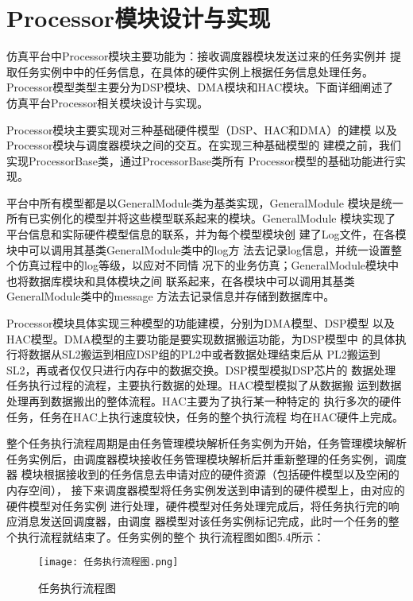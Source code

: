 \section{Processor模块设计与实现}

仿真平台中Processor模块主要功能为：接收调度器模块发送过来的任务实例并
提取任务实例中中的任务信息，在具体的硬件实例上根据任务信息处理任务。
Processor模型类型主要分为DSP模块、DMA模块和HAC模块。下面详细阐述了
仿真平台Processor相关模块设计与实现。

Processor模块主要实现对三种基础硬件模型（DSP、HAC和DMA）的建模
以及Processor模块与调度器模块之间的交互。在实现三种基础模型的
建模之前，我们实现ProcessorBase类，通过ProcessorBase类所有
Processor模型的基础功能进行实现。

平台中所有模型都是以GeneralModule类为基类实现，GeneralModule
模块是统一所有已实例化的模型并将这些模型联系起来的模块。GeneralModule
模块实现了平台信息和实际硬件模型信息的联系，并为每个模型模块创
建了Log文件，在各模块中可以调用其基类GeneralModule类中的log方
法去记录log信息，并统一设置整个仿真过程中的log等级，以应对不同情
况下的业务仿真；GeneralModule模块中也将数据库模块和具体模块之间
联系起来，在各模块中可以调用其基类GeneralModule类中的message
方法去记录信息并存储到数据库中。

Processor模块具体实现三种模型的功能建模，分别为DMA模型、DSP模型
以及HAC模型。DMA模型的主要功能是要实现数据搬运功能，为DSP模型中
的具体执行将数据从SL2搬运到相应DSP组的PL2中或者数据处理结束后从
PL2搬运到SL2，再或者仅仅只进行内存中的数据交换。DSP模型模拟DSP芯片的
数据处理任务执行过程的流程，主要执行数据的处理。HAC模型模拟了从数据搬
运到数据处理再到数据搬出的整体流程。HAC主要为了执行某一种特定的
执行多次的硬件任务，任务在HAC上执行速度较快，任务的整个执行流程
均在HAC硬件上完成。

整个任务执行流程周期是由任务管理模块解析任务实例为开始，任务管理模块解析
任务实例后，由调度器模块接收任务管理模块解析后并重新整理的任务实例，调度器
模块根据接收到的任务信息去申请对应的硬件资源（包括硬件模型以及空闲的内存空间），
接下来调度器模型将任务实例发送到申请到的硬件模型上，由对应的硬件模型对任务实例
进行处理，硬件模型对任务处理完成后，将任务执行完的响应消息发送回调度器，由调度
器模型对该任务实例标记完成，此时一个任务的整个执行流程就结束了。任务实例的整个
执行流程图如图5.4所示：
\begin{figure}
    \centering
    \texttt{[image: 任务执行流程图.png]}
    \caption{任务执行流程图}
    \label{fig:badge}
\end{figure}

